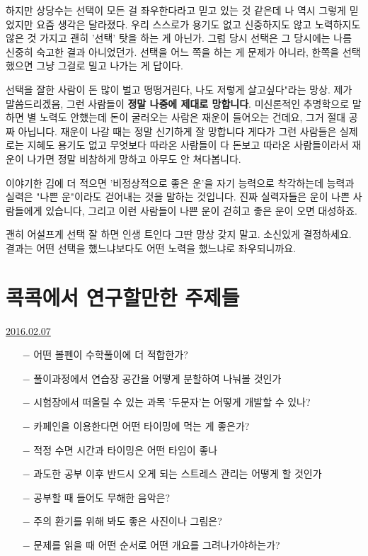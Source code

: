 하지만 상당수는 선택이 모든 걸 좌우한다라고 믿고 있는 것 같은데
나 역시 그렇게 믿었지만 요즘 생각은 달라졌다.
우리 스스로가 용기도 없고 신중하지도 않고 노력하지도 않은 것 가지고 괜히 '선택' 탓을 하는 게 아닌가.
그럼 당시 선택은 그 당시에는 나름 신중히 숙고한 결과 아니었던가.
선택을 어느 쪽을 하는 게 문제가 아니라, 한쪽을 선택했으면 그냥 그걸로 밀고 나가는 게 답이다.
\vspace{5mm}

선택을 잘한 사람이 돈 많이 벌고 떵떵거린다, 나도 저렇게 살고싶다"라는 망상.
제가 말씀드리겠음, 그런 사람들이 \textbf{정말 나중에 제대로 망합니다}.
미신론적인 추명학으로 말하면 별 노력도 안했는데 돈이 굴러오는 사람은 재운이 들어오는 건데요,
그거 절대 공짜 아닙니다. 재운이 나갈 때는 정말 신기하게 잘 망합니다
게다가 그런 사람들은 실제로는 지혜도 용기도 없고 무엇보다 따라온 사람들이 다 돈보고 따라온 사람들이라서
재운이 나가면 정말 비참하게 망하고 아무도 안 쳐다봅니다.
\vspace{5mm}

이야기한 김에 더 적으면 '비정상적으로 좋은 운'을 자기 능력으로 착각하는데
능력과 실력은 "나쁜 운"이라도 걷어내는 것을 말하는 것입니다.
진짜 실력자들은 운이 나쁜 사람들에게 있습니다, 그리고 이런 사람들이 나쁜 운이 걷히고 좋은 운이 오면 대성하죠.
\vspace{5mm}

괜히 어설프게 선택 잘 하면 인생 트인다 그딴 망상 갖지 말고. 소신있게 결정하세요.
결과는 어떤 선택을 했느냐보다도 어떤 노력을 했느냐로 좌우되니까요.
\vspace{5mm}






\section{콕콕에서 연구할만한 주제들}
\href{https://www.kockoc.com/Apoc/626685}{2016.02.07}

\vspace{5mm}
\begin{itemize}
    \item[$-$] 어떤 볼펜이 수학풀이에 더 적합한가?
    \item[$-$] 풀이과정에서 연습장 공간을 어떻게 분할하여 나눠볼 것인가
    \item[$-$] 시험장에서 떠올릴 수 있는 과목 '두문자'는 어떻게 개발할 수 있나?
    \item[$-$] 카페인을 이용한다면 어떤 타이밍에 먹는 게 좋은가?
    \item[$-$] 적정 수면 시간과 타이밍은 어떤 타임이 좋나
    \item[$-$] 과도한 공부 이후 반드시 오게 되는 스트레스 관리는 어떻게 할 것인가
    \item[$-$] 공부할 때 들어도 무해한 음악은?
    \item[$-$] 주의 환기를 위해 봐도 좋은 사진이나 그림은?
    \item[$-$] 문제를 읽을 때 어떤 순서로 어떤 개요를 그려나가야하는가?
\end{itemize}
\vspace{5mm}


